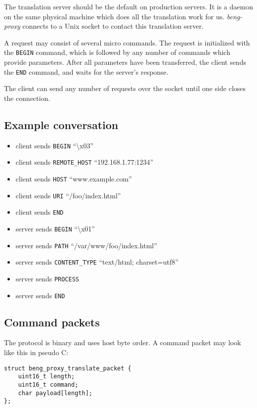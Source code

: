 \documentclass[a4paper,12pt]{article}
\begin{document}
The translation server should be the default on production servers.
It is a daemon on the same physical machine which does all the
translation work for us.  \emph{beng-proxy} connects to a Unix socket
to contact this translation server.

A request may consist of several micro commands.  The request is
initialized with the \texttt{BEGIN} command, which is followed by any
number of commands which provide parameters.  After all parameters
have been transferred, the client sends the \texttt{END} command,
and waits for the server's response.

The client can send any number of requests over the socket until one
side closes the connection.

\subsection{Example conversation}

\begin{itemize}
\item client sends \verb|BEGIN| ``\textbackslash{}x03''
\item client sends \verb|REMOTE_HOST| ``192.168.1.77:1234''
\item client sends \verb|HOST| ``www.example.com''
\item client sends \verb|URI| ``/foo/index.html''
\item client sends \verb|END|
\item server sends \verb|BEGIN| ``\textbackslash{}x01''
\item server sends \verb|PATH| ``/var/www/foo/index.html''
\item server sends \verb|CONTENT_TYPE| ``text/html; charset=utf8''
\item server sends \verb|PROCESS|
\item server sends \verb|END|
\end{itemize}

\subsection{Command packets}

The protocol is binary and uses host byte order.  A command packet may
look like this in pseudo C:

\begin{verbatim}
struct beng_proxy_translate_packet {
    uint16_t length;
    uint16_t command;
    char payload[length];
};
\end{verbatim}
\end{document}
